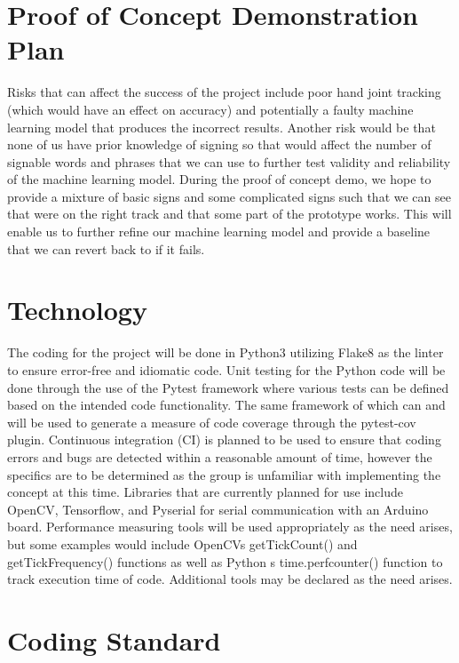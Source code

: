 \documentclass{article}
\begin{document}
\section{Proof of Concept Demonstration Plan}

Risks that can affect the success of the project include poor hand joint tracking
(which would have an effect on accuracy) and potentially a faulty machine learning model
that produces the incorrect results. Another risk would be that none of us have prior
knowledge of signing so that would affect the number of signable words and phrases that
we can use to further test validity and reliability of the machine learning model. During
the proof of concept demo, we hope to provide a mixture of basic signs and some complicated
signs such that we can see that we\textquotesingle re on the right track and that some part of the prototype
works. This will enable us to further refine our machine learning model and provide a
baseline that we can revert back to if it fails.

\section{Technology}

The coding for the project will be done in Python3 utilizing Flake8 as the linter
to ensure error-free and idiomatic code. Unit testing for the Python code will be done
through the use of the Pytest framework where various tests can be defined based on the
intended code functionality. The same framework of which can and will be used to generate
a measure of code coverage through the pytest-cov plugin. Continuous integration (CI) is
planned to be used to ensure that coding errors and bugs are detected within a reasonable
amount of time, however the specifics are to be determined as the group is unfamiliar with
implementing the concept at this time. Libraries that are currently planned for use include
OpenCV, Tensorflow, and Pyserial for serial communication with an Arduino board. Performance
measuring tools will be used appropriately as the need arises, but some examples would include
OpenCV\textquotesingle s getTickCount() and getTickFrequency() functions as well as Python\textquotesingle
s time.perf\textunderscore counter() function to track execution time of code. Additional tools
may be declared as the need arises.

\section{Coding Standard}
\end{document}
